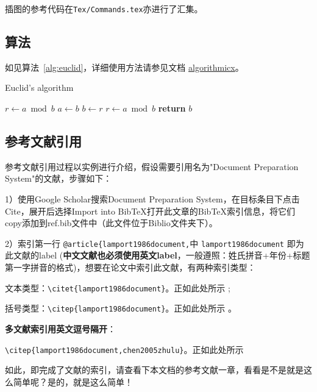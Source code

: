 插图的参考代码在\verb|Tex/Commands.tex|亦进行了汇集。

\subsection{算法}

如见算法~\ref{alg:euclid}，详细使用方法请参见文档 \href{https://ctan.org/pkg/algorithmicx?lang=en}{algorithmicx}。

\begin{algorithm}[!htbp]
    \small
    \caption{Euclid's algorithm}\label{alg:euclid}
    \begin{algorithmic}[1]
        \State $r\gets a\bmod b$
        \State $a\gets b$
        \State $b\gets r$
        \State $r\gets a\bmod b$
        \EndWhile\label{euclidendwhile}
        \State \textbf{return} $b$
        \EndProcedure
    \end{algorithmic}
\end{algorithm}

\subsection{参考文献引用}

参考文献引用过程以实例进行介绍，假设需要引用名为"Document Preparation System"的文献，步骤如下：

1）使用Google Scholar搜索Document Preparation System，在目标条目下点击Cite，展开后选择Import into BibTeX打开此文章的BibTeX索引信息，将它们copy添加到ref.bib文件中（此文件位于Biblio文件夹下）。

2）索引第一行 \verb|@article{lamport1986document,|中 \verb|lamport1986document| 即为此文献的label (\textbf{中文文献也必须使用英文label}，一般遵照：姓氏拼音+年份+标题第一字拼音的格式)，想要在论文中索引此文献，有两种索引类型：

文本类型：\verb|\citet{lamport1986document}|。正如此处所示 \citet{lamport1986document}; 

括号类型：\verb|\citep{lamport1986document}|。正如此处所示 \citep{lamport1986document}。

\textbf{多文献索引用英文逗号隔开}：

\verb|\citep{lamport1986document,chen2005zhulu}|。正如此处所示 \citep{lamport1986document,chen2005zhulu}

如此，即完成了文献的索引，请查看下本文档的参考文献一章，看看是不是就是这么简单呢？是的，就是这么简单！

